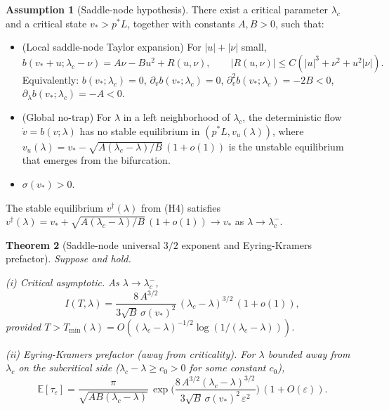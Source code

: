 \documentclass[11pt,a4paper]{article}
\theoremstyle{plain}
\newtheorem{theorem}{Theorem}[section]
\theoremstyle{definition}
\newtheorem{assumption}[theorem]{Assumption}
\newcommand{\E}{\mathbb{E}}
\newcommand{\eps}{\varepsilon}
\begin{document}
\begin{assumption}[Saddle-node hypothesis]\label{assump:saddle}
There exist a critical parameter $\lambda_c$ and a critical state $v_* > p^*L$, together with constants $A, B > 0$, such that:
\begin{itemize}
\item[(H5)] (Local saddle-node Taylor expansion) For $|u| + |\nu|$ small,
\begin{equation*}
b(v_* + u; \lambda_c - \nu) = A\nu - B u^2 + R(u, \nu),\qquad |R(u,\nu)| \leq C(|u|^3 + \nu^2 + u^2|\nu|).
\end{equation*}
Equivalently: $b(v_*;\lambda_c) = 0$, $\partial_v b(v_*;\lambda_c) = 0$, $\partial_v^2 b(v_*;\lambda_c) = -2B < 0$, $\partial_\lambda b(v_*;\lambda_c) = -A < 0$.
\item[(H6)] (Global no-trap) For $\lambda$ in a left neighborhood of $\lambda_c$, the deterministic flow $\dot v = b(v;\lambda)$ has no stable equilibrium in $(p^*L, v_u(\lambda))$, where $v_u(\lambda) = v_* - \sqrt{A(\lambda_c-\lambda)/B}\,(1+o(1))$ is the unstable equilibrium that emerges from the bifurcation.
\item[(H7)] $\sigma(v_*) > 0$.
\end{itemize}
The stable equilibrium $v^\dagger(\lambda)$ from (H4) satisfies $v^\dagger(\lambda) = v_* + \sqrt{A(\lambda_c - \lambda)/B}\,(1+o(1)) \to v_*$ as $\lambda \to \lambda_c^-$.
\end{assumption}

\begin{theorem}[Saddle-node universal $3/2$ exponent and Eyring-Kramers prefactor]\label{thm:saddle}
Suppose  and  hold.

\textit{(i) Critical asymptotic.} As $\lambda \to \lambda_c^-$,
\begin{equation}
I(T,\lambda) = \frac{8\,A^{3/2}}{3\sqrt{B}\,\sigma(v_*)^2}\,(\lambda_c - \lambda)^{3/2}\,(1 + o(1)),
\label{eq:saddle-rate}
\end{equation}
provided $T > T_{\min}(\lambda) = O((\lambda_c-\lambda)^{-1/2}\log(1/(\lambda_c-\lambda)))$.

\textit{(ii) Eyring-Kramers prefactor (away from criticality).} For $\lambda$ bounded away from $\lambda_c$ on the subcritical side ($\lambda_c - \lambda \geq c_0 > 0$ for some constant $c_0$),
\begin{equation}
\E[\tau_\eps] = \frac{\pi}{\sqrt{AB(\lambda_c - \lambda)}}\,\exp\!\Big(\frac{8\,A^{3/2}(\lambda_c-\lambda)^{3/2}}{3\sqrt B\,\sigma(v_*)^2\,\eps^2}\Big)\,(1 + O(\eps)).
\label{eq:saddle-EK}
\end{equation}
\end{theorem}
\end{document}
